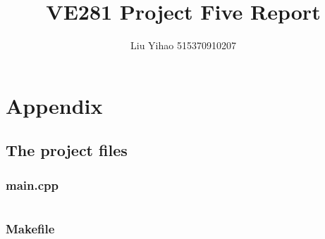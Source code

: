 \documentclass{article}
\title{VE281 Project Five Report}
\author{Liu Yihao 515370910207}
\date{}
\begin{document}
\maketitle

\section{Appendix}

\subsection{The project files}

\subsubsection{main.cpp}
\inputminted{c++}{../answer/main.cpp}
\subsubsection{Makefile}
\inputminted{makefile}{../answer/Makefile}
\end{document}
